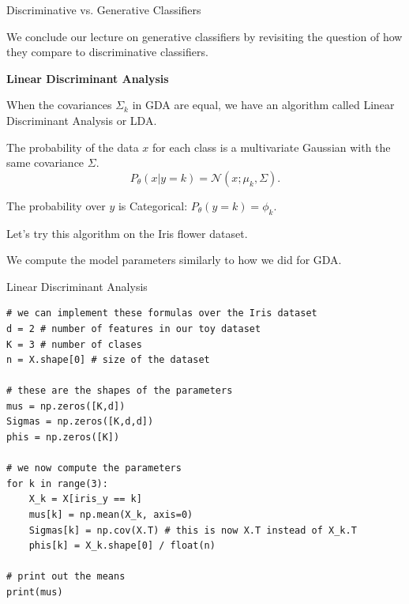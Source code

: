 \documentclass[../../main.tex]{subfiles}
\begin{document}
\begin{frame}[fragile]{Discriminative vs. Generative Classifiers}


We conclude our lecture on generative classifiers by revisiting the question of how they compare to discriminative classifiers.

\vspace{0.3cm}

\textbf{Linear Discriminant Analysis}

When the covariances $\Sigma_k$ in GDA are equal, we have an algorithm called Linear Discriminant Analysis or LDA.

The probability of the data $x$ for each class is a multivariate Gaussian with the same covariance $\Sigma$.
$$P_\theta(x|y=k) = \mathcal{N}(x ; \mu_k, \Sigma).$$

The probability over $y$ is Categorical:
$P_\theta(y=k) = \phi_k$.

\vspace{0.3cm}
Let's try this algorithm on the Iris flower dataset.

We compute the model parameters similarly to how we did for GDA.

\end{frame}

\begin{frame}[fragile]{Linear Discriminant Analysis}

\begin{lstlisting}
# we can implement these formulas over the Iris dataset
d = 2 # number of features in our toy dataset
K = 3 # number of clases
n = X.shape[0] # size of the dataset

# these are the shapes of the parameters
mus = np.zeros([K,d])
Sigmas = np.zeros([K,d,d])
phis = np.zeros([K])

# we now compute the parameters
for k in range(3):
    X_k = X[iris_y == k]
    mus[k] = np.mean(X_k, axis=0)
    Sigmas[k] = np.cov(X.T) # this is now X.T instead of X_k.T
    phis[k] = X_k.shape[0] / float(n)

# print out the means
print(mus)
\end{lstlisting}

\end{frame}
\end{document}
